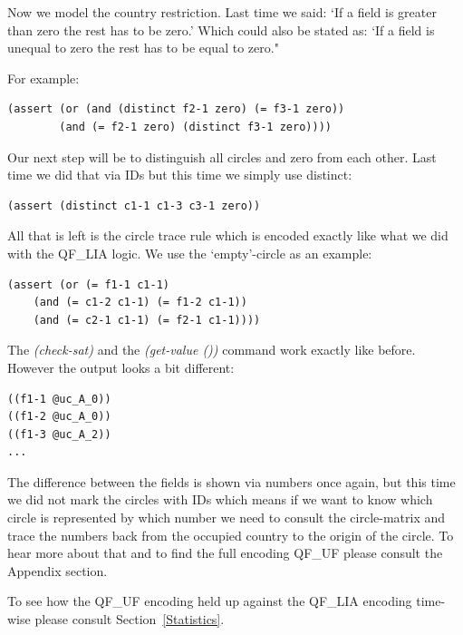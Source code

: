 Now we model the country restriction. Last time we said: `If a field is greater than zero the rest has to be zero.' Which could also be stated as: `If a field is unequal to zero the rest has to be equal to zero."

For example:
\begin{lstlisting}
(assert (or (and (distinct f2-1 zero) (= f3-1 zero)) 
	    (and (= f2-1 zero) (distinct f3-1 zero))))
\end{lstlisting}

Our next step will be to distinguish all circles and zero from each other. Last time we did that via IDs but this time we simply use distinct:
\begin{lstlisting}
(assert (distinct c1-1 c1-3 c3-1 zero))
\end{lstlisting}

All that is left is the circle trace rule which is encoded exactly like what we did with the QF\_LIA logic. We use the `empty'-circle as an example:
\begin{lstlisting}
(assert (or (= f1-1 c1-1) 
	(and (= c1-2 c1-1) (= f1-2 c1-1)) 
	(and (= c2-1 c1-1) (= f2-1 c1-1))))
\end{lstlisting}

The \emph{(check-sat)} and the \emph{(get-value ())} command work exactly like before. However the output looks a bit different:
\begin{lstlisting}
((f1-1 @uc_A_0))
((f1-2 @uc_A_0))
((f1-3 @uc_A_2))
...
\end{lstlisting}
The difference between the fields is shown via numbers once again, but this time we did not mark the circles with IDs which means if we want to know which circle is represented by which number we need to consult the circle-matrix and trace the numbers back from the occupied country to the origin of the circle. To hear more about that and to find the full encoding QF\_UF please consult the Appendix section.

To see how the QF\_UF encoding held up against the QF\_LIA encoding time-wise please consult Section~\ref{Statistics}.

